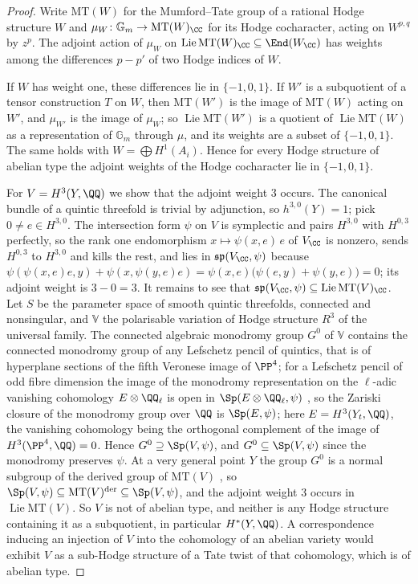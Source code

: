 \begin{proof}
Write $\mathrm{MT}(W)$ for the Mumford--Tate group of a rational Hodge
structure $W$ and $\mu_{W}\colon\mathbb{G}_{m}\to\mathrm{MT}(W)_{\CC}$ for
its Hodge cocharacter, acting on $W^{p,q}$ by $z^{p}$. The adjoint action of
$\mu_{W}$ on $\operatorname{Lie}\mathrm{MT}(W)_{\CC}\subseteq\End(W_{\CC})$ has weights
among the differences $p-p'$ of two Hodge indices of $W$.

If $W$ has weight one, these differences lie in $\{-1,0,1\}$. If $W'$ is a
subquotient of a tensor construction $T$ on $W$, then $\mathrm{MT}(W')$ is the
image of $\mathrm{MT}(W)$ acting on $W'$, and $\mu_{W'}$ is the image of
$\mu_{W}$; so $\operatorname{Lie}\mathrm{MT}(W')$ is a quotient of $\operatorname{Lie}\mathrm{MT}(W)$
as a representation of $\mathbb{G}_{m}$ through $\mu$, and its weights are a
subset of $\{-1,0,1\}$. The same holds with $W=\bigoplus H^{1}(A_{i})$.
Hence for every Hodge structure of abelian type the adjoint weights of the
Hodge cocharacter lie in $\{-1,0,1\}$.

For $V=H^{3}(Y,\QQ)$ we show that the adjoint weight $3$ occurs. The
canonical bundle of a quintic threefold is trivial by adjunction, so
$h^{3,0}(Y)=1$; pick $0\ne e\in H^{3,0}$. The intersection form $\psi$ on $V$
is symplectic and pairs $H^{3,0}$ with $H^{0,3}$ perfectly, so the rank one
endomorphism $x\mapsto\psi(x,e)\,e$ of $V_{\CC}$ is nonzero, sends $H^{0,3}$
to $H^{3,0}$ and kills the rest, and lies in $\mathfrak{sp}(V_{\CC},\psi)$
because $\psi(\psi(x,e)e,y)+\psi(x,\psi(y,e)e)
=\psi(x,e)\bigl(\psi(e,y)+\psi(y,e)\bigr)=0$; its adjoint weight is
$3-0=3$. It remains to see that $\mathfrak{sp}(V_{\CC},\psi)\subseteq
\operatorname{Lie}\mathrm{MT}(V)_{\CC}$. Let $S$ be the parameter space of smooth quintic
threefolds, connected and nonsingular, and $\mathbb{V}$ the polarisable
variation of Hodge structure $R^{3}$ of the universal family. The connected
algebraic monodromy group $G^{0}$ of $\mathbb{V}$ contains the connected
monodromy group of any Lefschetz pencil of quintics, that is of hyperplane
sections of the fifth Veronese image of $\PP^{4}$; for a Lefschetz pencil of
odd fibre dimension the image of the monodromy representation on the
$\ell$-adic vanishing cohomology $E\otimes\QQ_{\ell}$ is open in
$\Sp(E\otimes\QQ_{\ell},\psi)$ \cite[Theorem 5.10]{Del74}, so the Zariski
closure of the monodromy group over $\QQ$ is $\Sp(E,\psi)$; here
$E=H^{3}(Y_{t},\QQ)$, the vanishing cohomology being the orthogonal
complement of the image of $H^{3}(\PP^{4},\QQ)=0$. Hence $G^{0}\supseteq
\Sp(V,\psi)$, and $G^{0}\subseteq\Sp(V,\psi)$ since the monodromy preserves
$\psi$. At a very general
point $Y$ the group $G^{0}$ is a normal subgroup of the derived group of
$\mathrm{MT}(V)$ \cite[Theorem 1]{And92}, so $\Sp(V,\psi)\subseteq
\mathrm{MT}(V)^{\mathrm{der}}\subseteq\Sp(V,\psi)$, and the adjoint weight
$3$ occurs in $\operatorname{Lie}\mathrm{MT}(V)$. So $V$ is not of abelian type, and
neither is any Hodge structure containing it as a subquotient, in particular
$H^{*}(Y,\QQ)$. A correspondence inducing an injection of $V$ into the
cohomology of an abelian variety would exhibit $V$ as a sub-Hodge structure
of a Tate twist of that cohomology, which is of abelian type.
\end{proof}

